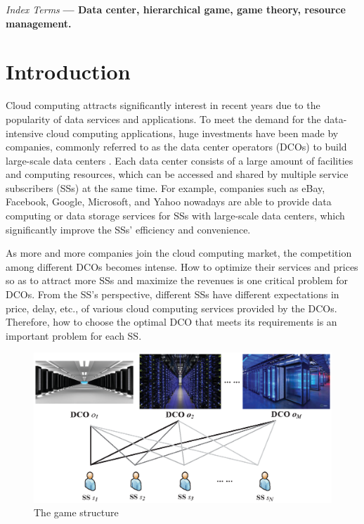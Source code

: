 \documentclass[twocolumn,10pt]{IEEEtran}
\begin{document}
{\it Index Terms} {\bf --- Data center, hierarchical game, game theory, resource management.}




\section{Introduction}


Cloud computing attracts significantly interest in recent years due to the popularity of data services and applications.
To meet the demand for the data-intensive cloud computing applications, huge investments have been made by companies, commonly referred to as the data center operators (DCOs) to build large-scale data centers \cite{AGreenberg02}. Each data center consists of a large amount of facilities and computing resources, which can be accessed and shared by multiple service subscribers (SSs) at the same time. For example, companies such as eBay, Facebook, Google, Microsoft, and Yahoo \cite{Amazon01,Google01,Google02,Microsoft01,Microsoft02,Yahoo01} nowadays are able to provide data computing or data storage services for SSs with large-scale data centers, which significantly improve the SSs' efficiency and convenience.






As more and more companies join the cloud computing market, the competition among different DCOs becomes intense.
How to optimize their services and prices so as to attract more SSs and maximize the revenues is one critical problem for DCOs.
From the SS's perspective, different SSs have different expectations in price, delay, etc., of various cloud computing services
provided by the DCOs. Therefore, how to choose the optimal DCO that meets its requirements is an important problem for each SS. %


\begin{figure}
\centering
\includegraphics[scale=0.5, bb=522 305 11 580]{fig_1.eps}
\caption{The game structure}
\label{fig:architecture}
\end{figure}
\end{document}
